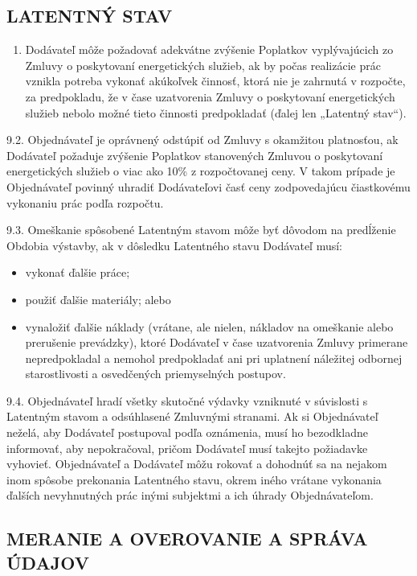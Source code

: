 \begin{multicols}{2}
\subsection{LATENTNÝ STAV}

\begin{enumerate}
\def\labelenumi{\arabic{enumi}.}
\item
  Dodávateľ môže požadovať adekvátne zvýšenie Poplatkov vyplývajúcich zo
  Zmluvy o poskytovaní energetických služieb, ak by počas realizácie
  prác vznikla potreba vykonať akúkoľvek činnosť, ktorá nie je zahrnutá
  v rozpočte, za predpokladu, že v čase uzatvorenia Zmluvy o poskytovaní
  energetických služieb nebolo možné tieto činnosti predpokladať (ďalej
  len „Latentný stav``).
\end{enumerate}

9.2. Objednávateľ je oprávnený odstúpiť od Zmluvy s okamžitou
platnosťou, ak Dodávateľ požaduje zvýšenie Poplatkov stanovených Zmluvou
o poskytovaní energetických služieb o viac ako 10\% z rozpočtovanej
ceny. V takom prípade je Objednávateľ povinný uhradiť Dodávateľovi časť
ceny zodpovedajúcu čiastkovému vykonaniu prác podľa rozpočtu.

9.3. Omeškanie spôsobené Latentným stavom môže byť dôvodom na predĺženie
Obdobia výstavby, ak v dôsledku Latentného stavu Dodávateľ musí:

\begin{itemize}
\item
  vykonať ďalšie práce;
\item
  použiť ďalšie materiály; alebo
\item
  vynaložiť ďalšie náklady (vrátane, ale nielen, nákladov na omeškanie
  alebo prerušenie prevádzky), ktoré Dodávateľ v čase uzatvorenia Zmluvy
  primerane nepredpokladal a nemohol predpokladať ani pri uplatnení
  náležitej odbornej starostlivosti a osvedčených priemyselných
  postupov.
\end{itemize}

9.4. Objednávateľ hradí všetky skutočné výdavky vzniknuté v súvislosti s
Latentným stavom a odsúhlasené Zmluvnými stranami. Ak si Objednávateľ
neželá, aby Dodávateľ postupoval podľa oznámenia, musí ho bezodkladne
informovať, aby nepokračoval, pričom Dodávateľ musí takejto požiadavke
vyhovieť. Objednávateľ a Dodávateľ môžu rokovať a dohodnúť sa na nejakom
inom spôsobe prekonania Latentného stavu, okrem iného vrátane vykonania
ďalších nevyhnutných prác inými subjektmi a ich úhrady Objednávateľom.

\subsection{MERANIE A OVEROVANIE A SPRÁVA ÚDAJOV}


\end{multicols}
